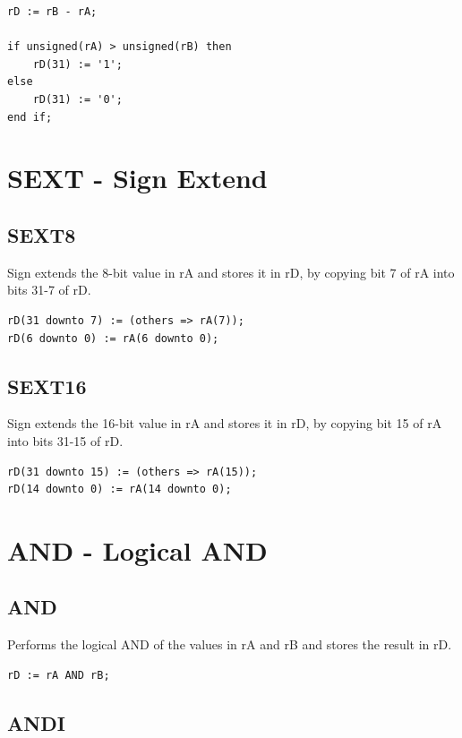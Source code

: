 \documentclass{UoYCSproject}
\begin{document}
\begin{lstlisting}
rD := rB - rA;

if unsigned(rA) > unsigned(rB) then
    rD(31) := '1';
else
    rD(31) := '0';
end if;
\end{lstlisting}

\section{SEXT - Sign Extend}

\subsection{SEXT8}

Sign extends the 8-bit value in rA and stores it in rD, by copying bit 7 of rA into bits 31-7 of rD.

\begin{lstlisting}
rD(31 downto 7) := (others => rA(7));
rD(6 downto 0) := rA(6 downto 0);
\end{lstlisting}

\subsection{SEXT16}

Sign extends the 16-bit value in rA and stores it in rD, by copying bit 15 of rA into bits 31-15 of rD.

\begin{lstlisting}
rD(31 downto 15) := (others => rA(15));
rD(14 downto 0) := rA(14 downto 0);
\end{lstlisting}

\section{AND - Logical AND}

\subsection{AND}

Performs the logical AND of the values in rA and rB and stores the result in rD.

\begin{lstlisting}
rD := rA AND rB;
\end{lstlisting}

\subsection{ANDI}
\end{document}
